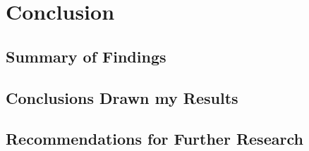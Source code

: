 \chapter{Conclusion}

\section{Summary of Findings}

\section{Conclusions Drawn my Results}

\section{Recommendations for Further Research}